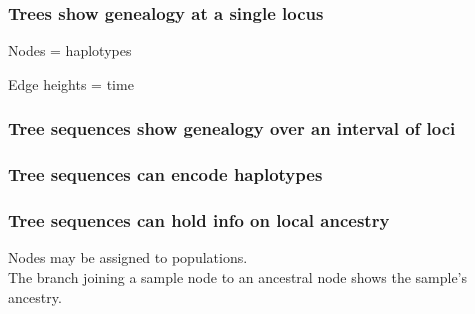 \documentclass[11pt, mathserif, aspectratio=169]{beamer}
\newcommand{\magenta}[1]{\textcolor{magenta}{#1}}
\newenvironment{wideitemize}{\itemize\addtolength{\itemsep}{10pt}}{\enditemize}
\begin{document}
\begin{frame}
\frametitle{Trees show genealogy at a single locus}
\begin{minipage}{.48\textwidth}
\begin{center}

\end{center}
\end{minipage}\hfill
\begin{minipage}{.48\textwidth}
\begin{wideitemize}
\item Nodes = haplotypes
\item Edge heights = time
\end{wideitemize}
\end{minipage}
\end{frame}

\begin{frame}
\frametitle{Tree sequences show genealogy over an interval of loci}
\begin{center}

\end{center}
\end{frame}

\begin{frame}
\frametitle{Tree sequences can encode haplotypes}
\begin{center}

\end{center}
\end{frame}

\begin{frame}
\frametitle{Tree sequences can hold info on local ancestry}
\begin{minipage}{.38\textwidth}
\begin{center}

\end{center}
\end{minipage}\hfill
\begin{minipage}{.58\textwidth}
Nodes may be assigned to populations.\\
The branch joining a sample node to an ancestral node shows the sample's ancestry.
\end{minipage}
\end{frame}
\end{document}
